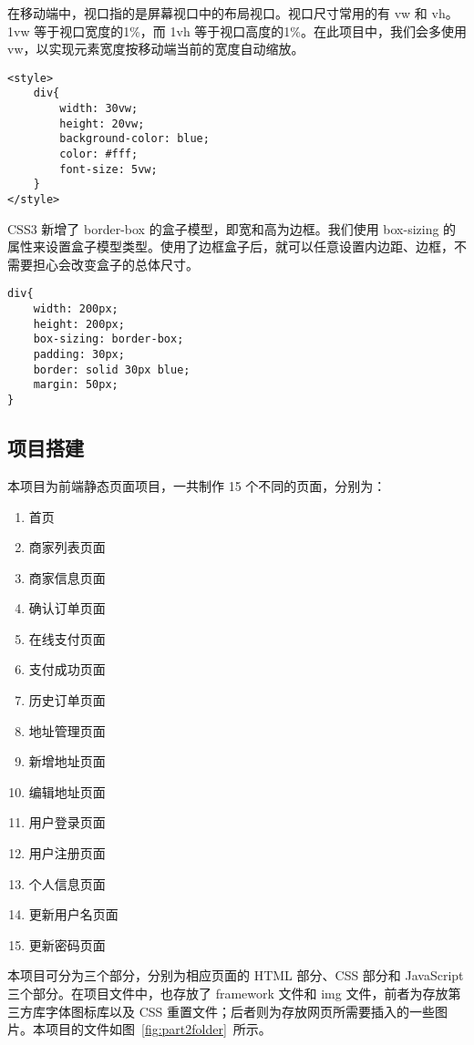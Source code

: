 在移动端中，视口指的是屏幕视口中的布局视口。视口尺寸常用的有 vw 和 vh。1vw 等于视口宽度的1\%，而 1vh 等于视口高度的1\%。在此项目中，我们会多使用 vw，以实现元素宽度按移动端当前的宽度自动缩放。
\begin{lstlisting}[basicstyle=\footnotesize]
<style>
    div{
        width: 30vw;
        height: 20vw;
        background-color: blue;
        color: #fff;
        font-size: 5vw;
    }
</style>
\end{lstlisting}

CSS3 新增了 border-box 的盒子模型，即宽和高为边框。我们使用 box-sizing 的属性来设置盒子模型类型。使用了边框盒子后，就可以任意设置内边距、边框，不需要担心会改变盒子的总体尺寸。
\begin{lstlisting}[basicstyle=\footnotesize]
div{
    width: 200px;
    height: 200px;
    box-sizing: border-box; 
    padding: 30px;
    border: solid 30px blue;
    margin: 50px;
}
\end{lstlisting}

\subsection{项目搭建}
本项目为前端静态页面项目，一共制作 15 个不同的页面，分别为：
\begin{enumerate}
    \item{首页}
    \item {商家列表页面}
    \item {商家信息页面}
    \item {确认订单页面}
    \item {在线支付页面}
    \item {支付成功页面}
    \item {历史订单页面}
    \item {地址管理页面}
    \item {新增地址页面}
    \item {编辑地址页面}
    \item {用户登录页面}
    \item {用户注册页面}
    \item {个人信息页面}
    \item {更新用户名页面}
    \item {更新密码页面}
\end{enumerate}

本项目可分为三个部分，分别为相应页面的 HTML 部分、CSS 部分和 JavaScript 三个部分。在项目文件中，也存放了 framework 文件和 img 文件，前者为存放第三方库字体图标库以及 CSS 重置文件；后者则为存放网页所需要插入的一些图片。本项目的文件如图~\ref{fig:part2folder}~所示。


